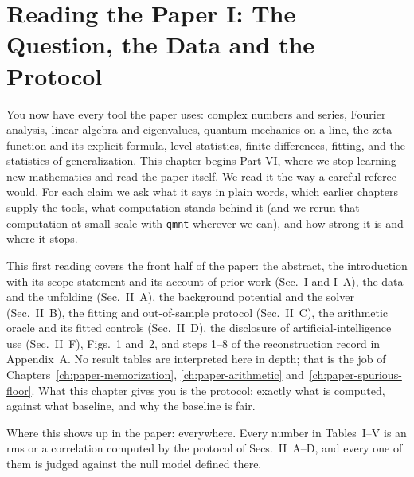 \chapter{Reading the Paper I: The Question, the Data and the Protocol}\label{ch:paper-setup}

\begin{chapterintro}
You now have every tool the paper uses: complex numbers and series, Fourier analysis, linear algebra and eigenvalues, quantum mechanics on a line, the zeta function and its explicit formula, level statistics, finite differences, fitting, and the statistics of generalization. This chapter begins Part VI, where we stop learning new mathematics and read the paper \cite{soniR1} itself. We read it the way a careful referee would. For each claim we ask what it says in plain words, which earlier chapters supply the tools, what computation stands behind it (and we rerun that computation at small scale with \texttt{qmnt} wherever we can), and how strong it is and where it stops.

This first reading covers the front half of the paper: the abstract, the introduction with its scope statement and its account of prior work (Sec.~I and I~A), the data and the unfolding (Sec.~II~A), the background potential and the solver (Sec.~II~B), the fitting and out-of-sample protocol (Sec.~II~C), the arithmetic oracle and its fitted controls (Sec.~II~D), the disclosure of artificial-intelligence use (Sec.~II~F), Figs.~1 and~2, and steps 1--8 of the reconstruction record in Appendix~A. No result tables are interpreted here in depth; that is the job of Chapters~\ref{ch:paper-memorization}, \ref{ch:paper-arithmetic} and~\ref{ch:paper-spurious-floor}. What this chapter gives you is the protocol: exactly what is computed, against what baseline, and why the baseline is fair.

Where this shows up in the paper: everywhere. Every number in Tables~I--V is an rms or a correlation computed by the protocol of Secs.~II~A--D, and every one of them is judged against the null model defined there.
\end{chapterintro}

